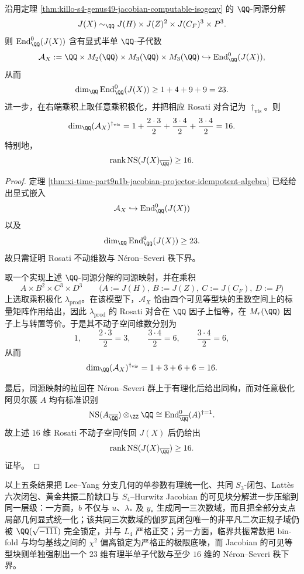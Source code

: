 \begin{theorem}\label{thm:xi-time-part65b-jacobian-visible-semisimple-ns-floor}
沿用定理 \ref{thm:killo-s4-genus49-jacobian-computable-isogeny} 的 \(\QQ\)-同源分解
\[
J(X)\sim_{\QQ}J(H)\times J(Z)^2\times J(C_F)^3\times P^3.
\]
则 \(\operatorname{End}_{\QQ}^0(J(X))\) 含有显式半单 \(\QQ\)-子代数
\[
\mathcal A_X:=\QQ\times M_2(\QQ)\times M_3(\QQ)\times M_3(\QQ)
\hookrightarrow
\operatorname{End}_{\QQ}^0(J(X)),
\]
从而
\[
\dim_{\QQ}\operatorname{End}_{\QQ}^0(J(X))\ge 1+4+9+9=23.
\]
进一步，在右端乘积上取任意乘积极化，并把相应 Rosati 对合记为 \(\dagger_{\mathrm{vis}}\)。则
\[
\dim_{\QQ}(\mathcal A_X)^{\dagger_{\mathrm{vis}}}
=
1+\frac{2\cdot 3}{2}+\frac{3\cdot 4}{2}+\frac{3\cdot 4}{2}
=
16.
\]
特别地，
\[
\operatorname{rank}\operatorname{NS}(J(X)_{\overline{\QQ}})\ge 16.
\]
\end{theorem}
\begin{proof}
定理 \ref{thm:xi-time-part9n1b-jacobian-projector-idempotent-algebra} 已经给出显式嵌入
\[
\mathcal A_X
\hookrightarrow
\operatorname{End}_{\QQ}^0(J(X))
\]
以及
\[
\dim_{\QQ}\operatorname{End}_{\QQ}^0(J(X))\ge 23.
\]
故只需证明 Rosati 不动维数与 N\'eron--Severi 秩下界。

取一个实现上述 \(\QQ\)-同源分解的同源映射，并在乘积
\[
A\times B^2\times C^3\times D^3
\qquad
\bigl(A:=J(H),\ B:=J(Z),\ C:=J(C_F),\ D:=P\bigr)
\]
上选取乘积极化 \(\lambda_{\mathrm{prod}}\)。在该模型下，\(\mathcal A_X\) 恰由四个可见等型块的重数空间上的标量矩阵作用给出，因此 \(\lambda_{\mathrm{prod}}\) 的 Rosati 对合在 \(\QQ\) 因子上恒等，在 \(M_r(\QQ)\) 因子上与转置等价。于是其不动子空间维数分别为
\[
1,\qquad \frac{2\cdot 3}{2}=3,\qquad \frac{3\cdot 4}{2}=6,\qquad \frac{3\cdot 4}{2}=6,
\]
从而
\[
\dim_{\QQ}(\mathcal A_X)^{\dagger_{\mathrm{vis}}}=1+3+6+6=16.
\]

最后，同源映射的拉回在 N\'eron--Severi 群上于有理化后给出同构，而对任意极化阿贝尔簇 \(A\) 均有标准识别
\[
\operatorname{NS}(A_{\overline{\QQ}})\otimes_{\ZZ}\QQ
\cong
\operatorname{End}^0_{\overline{\QQ}}(A)^{\dagger=1}.
\]
故上述 \(16\) 维 Rosati 不动子空间传回 \(J(X)\) 后仍给出
\[
\operatorname{rank}\operatorname{NS}(J(X)_{\overline{\QQ}})\ge 16.
\]
证毕。
\end{proof}

\noindent
以上五条结果把 Lee--Yang 分支几何的单参数有理统一化、共同 \(S_3\)-闭包、Latt\`es 六次闭包、黄金共振二阶缺口与 \(S_4\)--Hurwitz Jacobian 的可见块分解进一步压缩到同一层级：一方面，\(b\) 不仅与 \(u\)、\(\lambda_*\) 及 \(y_*\) 生成同一三次数域，而且把全部分支点局部几何显式统一化；该共同三次数域的伽罗瓦闭包唯一的非平凡二次正规子域仍被 \(\QQ(\sqrt{-111})\) 完全锁定，并与 \(L_4\) 严格正交；另一方面，临界共振常数把 bin-fold 与均匀基线之间的 \(\chi^2\) 偏离锁定为严格正的极限底噪，而 Jacobian 的可见等型块则单独强制出一个 \(23\) 维有理半单子代数与至少 \(16\) 维的 N\'eron--Severi 秩下界。

\endinput
